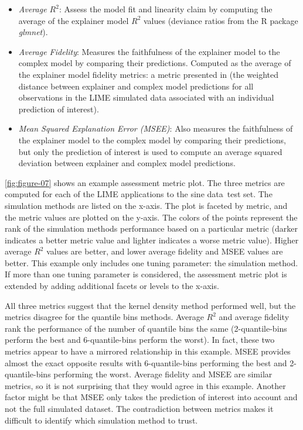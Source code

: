 \documentclass[AMS,STIX2COL]{WileyNJD-v2}\usepackage[]{graphicx}\usepackage[]{color}
\newcommand{\data}{sine data}
\begin{document}
\begin{itemize}
\item \emph{Average $R^2$}: Assess the model fit and linearity claim by computing the average of the explainer model $R^2$ values (deviance ratios from the R package \emph{glmnet}).

\item \emph{Average Fidelity}: Measures the faithfulness of the explainer model to the complex model by comparing their predictions. Computed as the average of the explainer model fidelity metrics: a metric presented in \citet{ribeiro:2016} (the weighted distance between explainer and complex model predictions for all observations in the LIME simulated data associated with an individual prediction of interest). 

\item \emph{Mean Squared Explanation Error (MSEE)}: Also measures the faithfulness of the explainer model to the complex model by comparing their predictions, but only the prediction of interest is used to compute an average squared deviation between explainer and complex model predictions.
\end{itemize}

\autoref{fig:figure-07} shows an example assessment metric plot. The three metrics are computed for each of the LIME applications to the \data \ test set. The simulation methods are listed on the x-axis. The plot is faceted by metric, and the metric values are plotted on the y-axis. The colors of the points represent the rank of the simulation methods performance based on a particular metric (darker indicates a better metric value and lighter indicates a worse metric value). Higher average $R^2$ values are better, and lower average fidelity and MSEE values are better. This example only includes one tuning parameter: the simulation method. If more than one tuning parameter is considered, the assessment metric plot is extended by adding additional facets or levels to the x-axis.

All three metrics suggest that the kernel density method performed well, but the metrics disagree for the quantile bins methods. Average $R^2$ and average fidelity rank the performance of the number of quantile bins the same (2-quantile-bins perform the best and 6-quantile-bins perform the worst). In fact, these two metrics appear to have a mirrored  relationship in this example. MSEE provides almost the exact opposite results with  6-quantile-bins performing the best and 2-quantile-bins performing the worst. Average fidelity and MSEE are similar metrics, so it is not surprising that they would agree in this example. Another factor might be that MSEE only takes the prediction of interest  into account and not the full simulated dataset. The contradiction between metrics makes it difficult to identify which simulation method to trust. 
\end{document}
